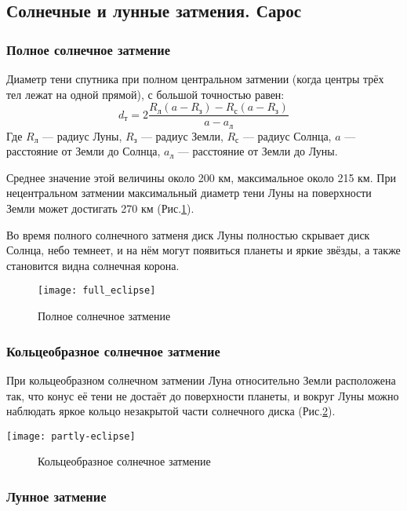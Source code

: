 \subsection{Солнечные и лунные затмения. Сарос}
\subsubsection{Полное солнечное затмение}
Диаметр тени спутника при полном центральном затмении (когда центры трёх тел лежат на одной прямой), с большой точностью равен:
\begin{equation}d_\text{т}=2\frac{R_\text{л}(a-R_\text{з})-R_\text{с}(a-R_\text{з})}{a-a_\text{л}}
\end{equation}
Где $R_\text{л}$ --- радиус Луны, $R_\text{з}$ --- радиус Земли, $R_\text{с}$ --- радиус Солнца, $a$ --- расстояние от Земли до Солнца, $a_\text{л}$ --- расстояние от Земли до Луны.

Среднее значение  этой величины около 200 км, максимальное около 215 км. При нецентральном затмении максимальный диаметр тени Луны на поверхности Земли может достигать 270 км (Рис.\ref{pic:full-eclipse}).

Во время полного солнечного затменя  диск Луны полностью скрывает диск Солнца, небо темнеет, и на нём могут появиться планеты и яркие звёзды, а также становится видна солнечная корона.

\begin{figure}[h!]
\texttt{[image: full\_eclipse]}
\caption{Полное солнечное затмение}\label{pic:full-eclipse}
\end{figure}

\subsubsection{Кольцеобразное солнечное затмение}
При кольцеобразном солнечном затмении Луна относительно Земли расположена так, что конус её тени не достаёт до поверхности планеты, и вокруг Луны можно наблюдать яркое кольцо незакрытой части солнечного диска (Рис.\ref{pic:partly-eclipse}).
\begin{center}
\texttt{[image: partly-eclipse]}
\begin{figure}[h!]
\caption{Кольцеобразное солнечное затмение}\label{pic:partly-eclipse}
\end{figure}
\end{center}
\subsubsection{Лунное затмение}

